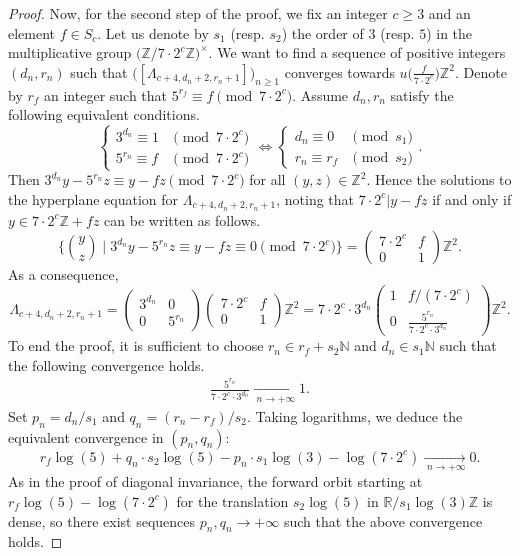 \documentclass[11pt,letterpaper]{amsart}
\theoremstyle{definition}
\theoremstyle{remark}
\newcommand{\bb}[1]{\mathbb{#1}}
\newcommand{\R}{\bb R}
\newcommand{\Z}{\bb Z}
\newcommand{\N}{\bb N}
\begin{document}
\begin{proof}
                                    
Now, for the second step of the proof, we fix an integer $c\geq 3$ and an element $f \in S_c$.
Let us denote by $s_1$ (resp. $s_2$) the order of $3$ (resp. $5$) in the multiplicative group $\big(\Z /7\cdot 2^c\Z\big)^\times$.
We want to find a sequence of positive integers $(d_n,r_n)$ such that
$\big([\Lambda_{c+4,d_n+2,r_n+1}]\big)_{n\geq 1}$ converges towards $u\big( \frac{f}{7 \cdot 2^c} \big)\Z^2$. 
Denote by $r_f$ an integer such that $5^{r_f} \equiv f \pmod{7 \cdot 2^c}$. 
Assume $d_n,r_n$ satisfy the following equivalent conditions.
	$$\left\lbrace
	\begin{array}{cr}
	3^{d_n} \equiv 1 &\pmod{ 7 \cdot 2^{c}}\\
	5^{r_n} \equiv f &\pmod{ 7 \cdot 2^{c} }
	\end{array}
	\right. \Longleftrightarrow 
	\left\lbrace
	\begin{array}{lr}
	d_n \equiv 0 &\pmod{s_1}\\
	r_n \equiv r_f &\pmod{s_2}
	\end{array}
	\right. .$$
Then $ 3^{d_n} y - 5^{r_n}z \equiv y - f z \pmod{7 \cdot 2^c}$ for all $(y,z) \in \Z^2$. 
Hence the solutions to the hyperplane equation for $\Lambda_{c+4,d_n+2,r_n+1}$, noting that $7 \cdot 2^c \vert y - fz$ if and only if $y \in 7 \cdot 2^c \Z + fz $ can be written as follows.  
$$\bigg\lbrace 
	\binom{y}{z}
	\; \bigg\vert \;
	3^{d_n} y - 5^{r_n} z \equiv y - f z \equiv 0 \pmod{ 7 \cdot 2^{c}}
	\bigg\rbrace = 
\begin{pmatrix}
7 \cdot 2^c & f \\
0 & 1	
\end{pmatrix}	\Z^2. $$	
As a consequence, 
$$\Lambda_{c+4,d_n+2,r_n+1} =  
\begin{pmatrix}
3^{d_n} & 0 \\
0 & 5^{r_n}
\end{pmatrix}
\begin{pmatrix}
7 \cdot 2^c & f \\
0 & 1	
\end{pmatrix}	\Z^2 = 
7 \cdot 2^c \cdot 3^{d_n}
\begin{pmatrix}
1 & f/(7 \cdot 2^c) \\
0 & \frac{5^{r_n}}{7 \cdot 2^c \cdot 3^{d_n}}
\end{pmatrix}	\Z^2.$$
To end the proof, it is sufficient to choose $r_n \in r_f+s_2\N$ and $d_n \in s_1 \N$ such that the following convergence holds.
\begin{eqnarray}
\frac{5^{r_n}}{7 \cdot 2^c \cdot 3^{d_n}} \xrightarrow[\; n \rightarrow + \infty]{} 1.
\end{eqnarray}
Set $p_n = d_n/s_1$ and $q_n = (r_n - r_f)/s_2$. Taking logarithms, we deduce the equivalent convergence in $(p_n,q_n)$:
$$ r_f \log (5) + q_n \cdot s_2 \log (5) - p_n \cdot s_1 \log(3) - \log(7 \cdot 2^c)  \xrightarrow[\; n \rightarrow + \infty]{} 0. $$
As in the proof of diagonal invariance, the forward orbit starting at $r_f \log(5) - \log(7 \cdot 2^c)$ for the translation $s_2 \log(5)$ in $\R / s_1\log(3)\Z$ is dense, so there exist sequences $p_n, q_n \rightarrow + \infty$ such that the above convergence holds.
	\end{proof}
	
\end{document}
